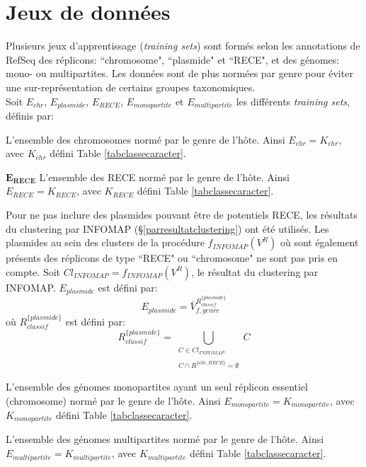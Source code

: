 \section{Jeux de données}
	Plusieurs jeux d'apprentissage (\textit{training sets}) sont formés selon les annotations de RefSeq des réplicons:  ``chromosome", ``plasmide" et ``RECE", et des génomes: mono- ou multipartites. Les données sont de plus normées par genre pour éviter une sur-représentation de certains groupes taxonomiques.
	\\
Soit $E_{chr}$, $E_{plasmide}$, $E_{RECE}$, $E_{monopartite}$ et $E_{multipartite}$ les différents \textit{training sets}, définis par:
\begin{description}
	\item[$\mathbf{E_{chr}}$] L'ensemble des chromosomes normé par le genre de l'hôte. Ainsi $E_{chr}=K_{chr}$, avec $K_{chr}$ défini Table \ref{tabclassecaracter}.
	\item$\mathbf{E_{RECE}}$ L'ensemble des RECE normé par le genre de l'hôte. Ainsi $E_{RECE}=K_{RECE}$, avec $K_{RECE}$ défini Table \ref{tabclassecaracter}.
	 \item[$\mathbf{E_{plasmide}}$] Pour ne pas inclure des plasmides pouvant être de potentiels RECE, les résultats du clustering par INFOMAP (\S \ref{parresultatclustering}) ont été utilisés. Les plasmides au sein des clusters de la procédure $f_{INFOMAP}(V^{R})$ où sont également présents des réplicons de type ``RECE" ou ``chromosome" ne sont pas pris en compte. Soit $Cl_{INFOMAP}=f_{INFOMAP}(V^{R})$, le résultat du clustering par INFOMAP. $E_{plasmide}$ est défini par:
		\begin{equation}
			E_{plasmide}=\bar{V}^{R^{\{plasmide\}}_{classif}}_{f,genre}
		\end{equation}
	où $R^{\{plasmide\}}_{classif}$ est défini par:
		\begin{equation}
			R^{\{plasmide\}}_{classif}=\bigcup_{\substack{C \in Cl_{INFOMAP}\\\\C \cap R^{\{chr,RECE\}}=\emptyset}}C
		\end{equation}
	\item[$\mathbf{E_{monopartite}}$] L'ensemble des génomes monopartites ayant un seul réplicon essentiel (chromosome) normé par le genre de l'hôte. Ainsi $E_{monopartite}=K_{monopartite}$, avec $K_{monopartite}$ défini Table \ref{tabclassecaracter}.
	\item[$\mathbf{E_{multipartite}}$] L'ensemble des génomes multipartites normé par le genre de l'hôte. Ainsi $E_{multipartite}=K_{multipartite}$, avec $K_{multipartite}$ défini Table \ref{tabclassecaracter}.
\end{description} 
\bigskip     

